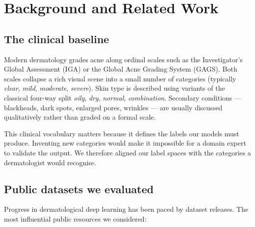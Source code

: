 \documentclass[11pt,a4paper,oneside]{report}
\begin{document}
\chapter{Background and Related Work}\label{ch:background}

\section{The clinical baseline}

Modern dermatology grades acne along ordinal scales such as the
Investigator's Global Assessment (IGA) or the Global Acne Grading
System (GAGS). Both scales collapse a rich visual scene into a small
number of categories (typically \emph{clear}, \emph{mild},
\emph{moderate}, \emph{severe}). Skin type is described using variants
of the classical four-way split \emph{oily}, \emph{dry}, \emph{normal},
\emph{combination}. Secondary conditions --- blackheads, dark spots,
enlarged pores, wrinkles --- are usually discussed qualitatively
rather than graded on a formal scale.

This clinical vocabulary matters because it defines the labels our
models must produce. Inventing new categories would make it impossible
for a domain expert to validate the output. We therefore aligned our
label spaces with the categories a dermatologist would recognise.

\section{Public datasets we evaluated}

Progress in dermatological deep learning has been paced by dataset
releases. The most influential public resources we considered:
\end{document}

